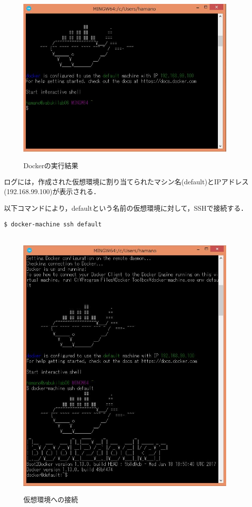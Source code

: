 \begin{figure}[htb]
\centering　
\includegraphics[width=11cm]{8.JPG}
\caption{Dockerの実行結果}\label{tab:uac}
\end{figure}
ログには，作成された仮想環境に割り当てられたマシン名(default)とIPアドレス(192.168.99.100)が表示される．
\newpage

以下コマンドにより，defaultという名前の仮想環境に対して，SSHで接続する．

\begin{lstlisting}[basicstyle=\ttfamily\footnotesize, frame=single]
$ docker-machine ssh default
\end{lstlisting}


\begin{figure}[htb]
\centering　
\includegraphics[width=11cm]{9.JPG}
\caption{仮想環境への接続}\label{tab:uac}
\end{figure}

